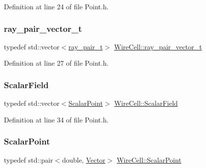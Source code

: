 Definition at line 24 of file Point.\+h.

\mbox{\label{namespace_wire_cell_a15d47ec1e9e43890c5cb09f1e9d77dd3}} 
\subsubsection{\texorpdfstring{ray\+\_\+pair\+\_\+vector\+\_\+t}{ray\_pair\_vector\_t}}
{\footnotesize\ttfamily typedef std\+::vector$<$\hyperlink{namespace_wire_cell_a8d74e36d330a8250d92fd4415822c5bc}{ray\+\_\+pair\+\_\+t}$>$ \hyperlink{namespace_wire_cell_a15d47ec1e9e43890c5cb09f1e9d77dd3}{Wire\+Cell\+::ray\+\_\+pair\+\_\+vector\+\_\+t}}



Definition at line 27 of file Point.\+h.

\mbox{\label{namespace_wire_cell_ab842150a1d0627e0477dcd59ff427296}} 
\subsubsection{\texorpdfstring{Scalar\+Field}{ScalarField}}
{\footnotesize\ttfamily typedef std\+::vector$<$\hyperlink{namespace_wire_cell_a8f847a3b6be6f6f898cbae3fa35098da}{Scalar\+Point}$>$ \hyperlink{namespace_wire_cell_ab842150a1d0627e0477dcd59ff427296}{Wire\+Cell\+::\+Scalar\+Field}}



Definition at line 34 of file Point.\+h.

\mbox{\label{namespace_wire_cell_a8f847a3b6be6f6f898cbae3fa35098da}} 
\subsubsection{\texorpdfstring{Scalar\+Point}{ScalarPoint}}
{\footnotesize\ttfamily typedef std\+::pair$<$double, \hyperlink{namespace_wire_cell_aa3c82d3ba85f032b0d278b7004846800}{Vector}$>$ \hyperlink{namespace_wire_cell_a8f847a3b6be6f6f898cbae3fa35098da}{Wire\+Cell\+::\+Scalar\+Point}}



